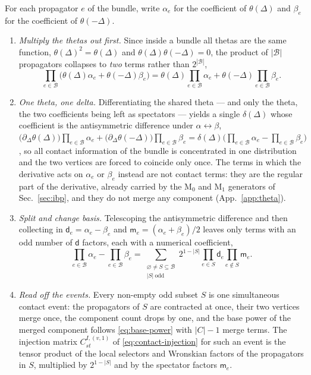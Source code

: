 \documentclass[11pt,a4paper]{article}
\numberwithin{table}{section}
\newcommand{\cB}{\mathcal B}
\begin{document}
For each propagator $e$ of the bundle, write $\alpha_e$ for the coefficient of
$\theta(\Delta)$ and $\beta_e$ for the coefficient of $\theta(-\Delta)$.
\begin{enumerate}
  \item \emph{Multiply the thetas out first.} Since inside a bundle all thetas are the same
        function, $\theta(\Delta)^2=\theta(\Delta)$ and $\theta(\Delta)\theta(-\Delta)=0$, the
        product of $|\cB|$ propagators collapses to \emph{two} terms rather than $2^{|\cB|}$,
        \begin{equation}
          \prod_{e\in\cB}\Big(\theta(\Delta)\alpha_e+\theta(-\Delta)\beta_e\Big)
          =\theta(\Delta)\prod_{e\in\cB}\alpha_e
          +\theta(-\Delta)\prod_{e\in\cB}\beta_e .
          \label{eq:bundle-two-terms}
        \end{equation}
  \item \emph{One theta, one delta.} Differentiating the shared theta --- and only the theta, the two
        coefficients being left as spectators --- yields a single
        $\delta(\Delta)$ whose coefficient is the antisymmetric difference under
        $\alpha\leftrightarrow\beta$,
        $\big(\partial_\Delta\theta(\Delta)\big)\prod_{e\in\cB}\alpha_e
        +\big(\partial_\Delta\theta(-\Delta)\big)\prod_{e\in\cB}\beta_e
        =\delta(\Delta)\big(\prod_{e\in\cB}\alpha_e-\prod_{e\in\cB}\beta_e\big)$, so all contact information of
        the bundle is concentrated in one distribution and the two vertices are forced to coincide
        only once. The terms in which the derivative acts on $\alpha_e$ or $\beta_e$ instead are not
        contact terms: they are the regular part of the derivative, already carried by the
        $\text{M}_0$ and $\text{M}_1$ generators of Sec.~\ref{sec:ibp}, and they do not merge any component
        (App.~\ref{app:theta}).
  \item \emph{Split and change basis.} Telescoping the antisymmetric difference and then collecting
        in $\mathsf d_e=\alpha_e-\beta_e$ and $\mathsf m_e=(\alpha_e+\beta_e)/2$ leaves only terms
        with an odd number of $\mathsf d$ factors, each with a numerical coefficient,
        \begin{equation}
          \prod_{e\in\cB}\alpha_e-\prod_{e\in\cB}\beta_e
          =\sum_{\substack{\varnothing\neq S\subseteq\cB\\|S|\ \mathrm{odd}}}
          2^{1-|S|}\prod_{e\in S}\mathsf d_e\prod_{e\notin S}\mathsf m_e .
          \label{eq:bundle-odd-subsets}
        \end{equation}
  \item \emph{Read off the events.} Every non-empty odd subset $S$ is one simultaneous contact
        event: the propagators of $S$ are contracted at once, their two vertices merge once, the component
        count drops by one, and the base power of the merged component follows
        \eqref{eq:base-power} with $|C|-1$ merge terms. The injection matrix
        $C^{I,(v,1)}_{st}$ of \eqref{eq:contact-injection} for such an event is the tensor product of
        the local selectors and Wronskian factors of the propagators in $S$, multiplied by
        $2^{1-|S|}$ and by the spectator factors $\mathsf m_e$.
\end{enumerate}
\end{document}
